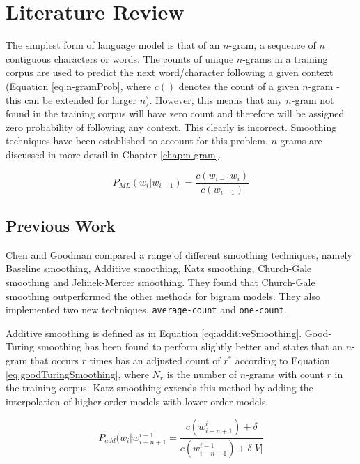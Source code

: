 \chapter{Literature Review}\label{chap:literatureReview}


The simplest form of language model is that of an $n$-gram, a sequence of $n$ contiguous characters or words. The counts of unique $n$-grams in a training corpus are used to predict the next word/character following a given context (Equation \ref{eq:n-gramProb}, where $c()$ denotes the count of a given $n$-gram - this can be extended for larger $n$). However, this means that any $n$-gram not found in the training corpus will have zero count and therefore will be assigned zero probability of following any context. This clearly is incorrect. Smoothing techniques have been established to account for this problem. $n$-grams are discussed in more detail in Chapter \ref{chap:n-gram}. 

\begin{equation}
P_{ML}(w_{i}|w_{i-1})=\frac{c(w_{i-1}w_{i})}{c(w_{i-1})}
\label{eq:n-gramProb}
\end{equation}

\section{Previous Work}

Chen and Goodman \cite{chen1996empirical} compared a range of different smoothing techniques, namely Baseline smoothing, Additive smoothing, Katz smoothing, Church-Gale smoothing and Jelinek-Mercer smoothing. They found that Church-Gale smoothing outperformed the other methods for bigram models. They also implemented two new techniques, \lstinline!average-count! and \lstinline!one-count!.


Additive smoothing is defined as in Equation \ref{eq:additiveSmoothing}. Good-Turing smoothing has been found to perform slightly better and states that an $n$-gram that occurs $r$ times has an adjusted count of $r^{*}$ according to Equation \ref{eq:goodTuringSmoothing}, where $N_{r}$ is the number of $n$-grams with count $r$ in the training corpus. Katz smoothing extends this method by adding the interpolation of higher-order models with lower-order models. 



\begin{equation}
\label{eq:additiveSmoothing}
P_{add}(w_{i}|w_{i-n+1}^{i-1}=\frac{c(w_{i-n+1}^{i})+\delta}{c(w_{i-n+1}^{i-1})+\delta|V|}
\end{equation}

